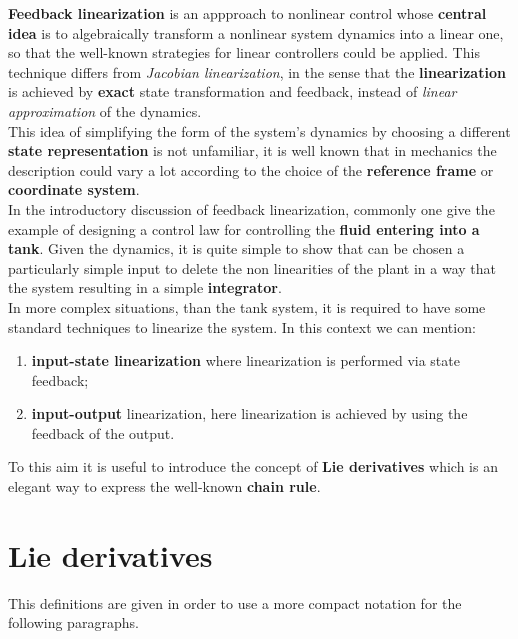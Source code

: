 \textbf{Feedback linearization} is an appproach to nonlinear control whose \textbf{central idea} is to algebraically transform a nonlinear system dynamics into a linear one, so that the well-known strategies for linear controllers could be applied. This technique differs from \textit{Jacobian linearization}, in the sense that the \textbf{linearization} is achieved by \textbf{exact} state transformation and feedback, instead of \textit{linear approximation} of the dynamics.\\

This idea of simplifying the form of the system's dynamics by choosing a different \textbf{state representation} is not unfamiliar, it is well known that in mechanics the description could vary a lot according to the choice of the \textbf{reference frame} or \textbf{coordinate system}.  \\

In the introductory discussion of feedback linearization, commonly one give the example of designing a control law for controlling the \textbf{fluid entering into a tank}. Given the dynamics, it is  quite simple to show that can be chosen a particularly simple input to delete the non linearities of the plant in a way that the system resulting in a simple \textbf{integrator}.\\
In more complex situations, than the tank system, it is required to have some standard techniques to linearize the system. In this context we can mention:
\begin{enumerate}
    \item \textbf{input-state linearization} where linearization is performed via state feedback; 
    \item \textbf{input-output} linearization, here linearization is achieved by using the feedback of the output.
\end{enumerate}

To this aim it is useful to introduce the concept of \textbf{Lie derivatives} which is an elegant way to express the well-known \textbf{chain rule}. 
\section{Lie derivatives}
This definitions are given in order to use a more compact notation for the following paragraphs. \\

\hspace*{-5mm}
% 

